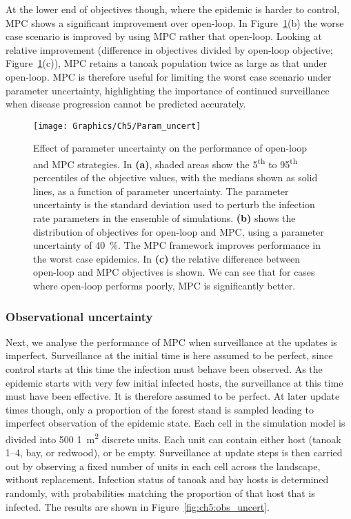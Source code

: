 At the lower end of objectives though, where the epidemic is harder to control, MPC shows a significant improvement over open-loop. In Figure~\ref{fig:ch5:param_uncert}(b) the worse case scenario is improved by using MPC rather that open-loop. Looking at relative improvement (difference in objectives divided by open-loop objective; Figure~\ref{fig:ch5:param_uncert}(c)), MPC retains a tanoak population twice as large as that under open-loop. MPC is therefore useful for limiting the worst case scenario under parameter uncertainty, highlighting the importance of continued surveillance when disease progression cannot be predicted accurately.

\begin{figure}[h]
    \begin{center}
        \texttt{[image: Graphics/Ch5/Param\_uncert]}
        \caption[Performance of OL and MPC under parameter uncertainty]{Effect of parameter uncertainty on the performance of open-loop and MPC strategies. In \textbf{(a)}, shaded areas show the 5\textsuperscript{th} to 95\textsuperscript{th} percentiles of the objective values, with the medians shown as solid lines, as a function of parameter uncertainty. The parameter uncertainty is the standard deviation used to perturb the infection rate parameters in the ensemble of simulations. \textbf{(b)} shows the distribution of objectives for open-loop and MPC, using a parameter uncertainty of \SI{40}{\percent}. The MPC framework improves performance in the worst case epidemics. In \textbf{(c)} the relative difference between open-loop and MPC objectives is shown. We can see that for cases where open-loop performs poorly, MPC is significantly better.\label{fig:ch5:param_uncert}}
    \end{center}
\end{figure}
\FloatBarrier
\subsubsection{Observational uncertainty}

Next, we analyse the performance of MPC when surveillance at the updates is imperfect. Surveillance at the initial time is here assumed to be perfect, since control starts at this time the infection must behave been observed. As the epidemic starts with very few initial infected hosts, the surveillance at this time must have been effective. It is therefore assumed to be perfect. At later update times though, only a proportion of the forest stand is sampled leading to imperfect observation of the epidemic state. Each cell in the simulation model is divided into 500 \SI{1}{\meter\squared} discrete units. Each unit can contain either host (tanoak 1--4, bay, or redwood), or be empty. Surveillance at update steps is then carried out by observing a fixed number of units in each cell across the landscape, without replacement. Infection status of tanoak and bay hosts is determined randomly, with probabilities matching the proportion of that host that is infected. The results are shown in Figure~\ref{fig:ch5:obs_uncert}.

